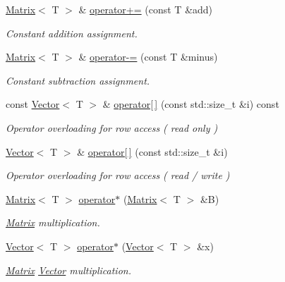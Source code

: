 \begin{DoxyCompactItemize}
\hyperlink{classLuna_1_1Matrix}{Matrix}$<$ T $>$ \& \hyperlink{classLuna_1_1Matrix_a6e19b5d45b923db766eddcc771af1b89}{operator+=} (const T \&add)
\begin{DoxyCompactList}\small\item\em Constant addition assignment. \end{DoxyCompactList}\item 
\hyperlink{classLuna_1_1Matrix}{Matrix}$<$ T $>$ \& \hyperlink{classLuna_1_1Matrix_a75b4e5e93c8f37c479fd5b89c4309adb}{operator-\/=} (const T \&minus)
\begin{DoxyCompactList}\small\item\em Constant subtraction assignment. \end{DoxyCompactList}\item 
const \hyperlink{classLuna_1_1Vector}{Vector}$<$ T $>$ \& \hyperlink{classLuna_1_1Matrix_a4ec4ab28a127aabe51181429a34a1d1b}{operator\mbox{[}$\,$\mbox{]}} (const std\+::size\+\_\+t \&i) const
\begin{DoxyCompactList}\small\item\em Operator overloading for row access ( read only ) \end{DoxyCompactList}\item 
\hyperlink{classLuna_1_1Vector}{Vector}$<$ T $>$ \& \hyperlink{classLuna_1_1Matrix_a3e6bad71721d5a1e5a458ab77bcc18c7}{operator\mbox{[}$\,$\mbox{]}} (const std\+::size\+\_\+t \&i)
\begin{DoxyCompactList}\small\item\em Operator overloading for row access ( read / write ) \end{DoxyCompactList}\item 
\hyperlink{classLuna_1_1Matrix}{Matrix}$<$ T $>$ \hyperlink{classLuna_1_1Matrix_a147f05fd2ce2ce50f5338284f2843998}{operator$\ast$} (\hyperlink{classLuna_1_1Matrix}{Matrix}$<$ T $>$ \&B)
\begin{DoxyCompactList}\small\item\em \hyperlink{classLuna_1_1Matrix}{Matrix} multiplication. \end{DoxyCompactList}\item 
\hyperlink{classLuna_1_1Vector}{Vector}$<$ T $>$ \hyperlink{classLuna_1_1Matrix_a3be494c5342728a7ee22d20861e74e42}{operator$\ast$} (\hyperlink{classLuna_1_1Vector}{Vector}$<$ T $>$ \&x)
\begin{DoxyCompactList}\small\item\em \hyperlink{classLuna_1_1Matrix}{Matrix} \hyperlink{classLuna_1_1Vector}{Vector} multiplication. \end{DoxyCompactList}\item 

\end{DoxyCompactItemize}
